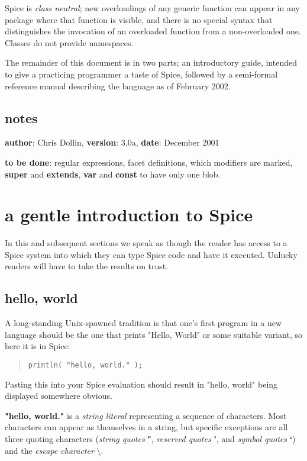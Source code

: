 \documentclass{report}
\begin{document}
Spice is {\em class neutral}; new overloadings of any generic function can appear
in any package where that function is visible, and there is no special syntax
that distinguishes the invocation of an overloaded function from a
non-overloaded one. Classes do not provide namespaces.

The remainder of this document is in two parts; an introductory guide,
intended to give a practicing programmer a taste of Spice, followed by a
semi-formal reference manual describing the language as of February 2002.

\section{notes}


{\bf author}: Chris Dollin, {\bf version}: 3.0a, {\bf date}: December 2001

{\bf to be done}: regular expressions, facet definitions, which modifiers are
marked, {\bf super} and {\bf extends}, {\bf var} and {\bf const} to have only one blob.\chapter{a gentle introduction to Spice}


In this and subsequent sections we speak as though the reader has access to a
Spice system into which they can type Spice code and have it executed. Unlucky
readers will have to take the results on trust.

\section{hello, world}


A long-standing Unix-spawned tradition is that one's first program in a new
language should be the one that prints "Hello, World" or some suitable
variant, so here it is in Spice:

\begin{quote}
\begin{verbatim}
println( "hello, world." );
\end{verbatim}
\end{quote}


Pasting this into your Spice evaluation should result in "hello, world" being
displayed somewhere obvious.

{\bf "hello, world."} is a {\em string literal} representing a sequence of characters.
Most characters can appear as themselves in a string, but specific exceptions
are all three quoting characters ({\em string quotes} {\bf "}, {\em reserved quotes} {\bf '},
and {\em symbol quotes} {\bf `}) and the {\em escape character} $\setminus$.
\end{document}
